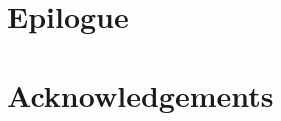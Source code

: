 \documentclass[oneside]{book}
\begin{document}
\frontmatter
\begin{titlepage}
\centering
\vspace*{\fill}
\MakeUppercase{\Huge\bfseries\thebook} \\
~ \\
\MakeUppercase{\Large\theauthor} 
\vspace*{\fill}
\end{titlepage}
\chapter*{\thebook}
\thispagestyle{empty}

\chapter*{}
\thispagestyle{empty}

\mainmatter

\chapter*{Epilogue}

\chapter*{Acknowledgements}

\end{document}
